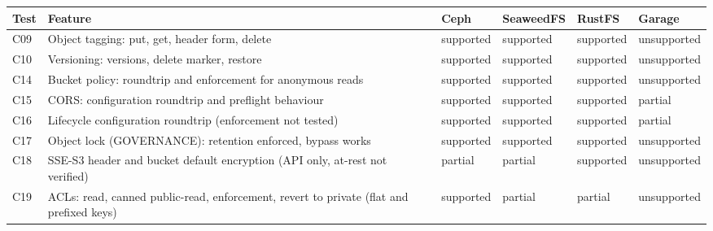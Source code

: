 \begin{tabular}{@{}llllll@{}}
\toprule
Test & Feature & Ceph & SeaweedFS & RustFS & Garage \\
\midrule
C09 & Object tagging: put, get, header form, delete & supported & supported & supported & unsupported \\
C10 & Versioning: versions, delete marker, restore & supported & supported & supported & unsupported \\
C14 & Bucket policy: roundtrip and enforcement for anonymous reads & supported & supported & supported & unsupported \\
C15 & CORS: configuration roundtrip and preflight behaviour & supported & supported & supported & partial \\
C16 & Lifecycle configuration roundtrip (enforcement not tested) & supported & supported & supported & partial \\
C17 & Object lock (GOVERNANCE): retention enforced, bypass works & supported & supported & supported & unsupported \\
C18 & SSE-S3 header and bucket default encryption (API only, at-rest not verified) & partial & partial & supported & unsupported \\
C19 & ACLs: read, canned public-read, enforcement, revert to private (flat and prefixed keys) & supported & partial & partial & unsupported \\
\bottomrule
\end{tabular}
